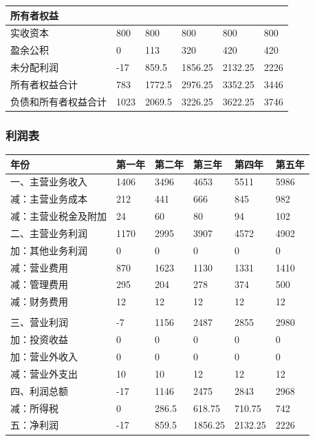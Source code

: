 \documentclass[UTF8]{ctexart}
\begin{document}
\begin{table}[H]
\begin{tabular}{|l|l|l|l|l|l|}
		所有者权益           &        &        &         &         &        \\ \hline
		实收资本             & 800    & 800    & 800     & 800     & 800    \\ \hline
		盈余公积             & 0      & 113    & 320     & 420     & 420    \\ \hline
		未分配利润           & -17    & 859.5  & 1856.25 & 2132.25 & 2226   \\ \hline
		所有者权益合计       & 783    & 1772.5 & 2976.25 & 3352.25 & 3446   \\ \hline

		负债和所有者权益合计 & 1023   & 2069.5 & 3226.25 & 3622.25 & 3746   \\ \hline
	\end{tabular}
\end{table}
\subsubsection{利润表}
\begin{table}[H]
	\centering
	\begin{tabular}{|l|l|l|l|l|l|}
		\hline
		年份                 & 第一年 & 第二年 & 第三年  & 第四年  & 第五年 \\ \hline
		一、主营业务收入     & 1406   & 3496   & 4653    & 5511    & 5986   \\ \hline
		减：主营业务成本     & 212    & 441    & 666     & 845     & 982    \\ \hline
		减：主营业税金及附加 & 24     & 60     & 80      & 94      & 102    \\ \hline
		二、主营业务利润     & 1170   & 2995   & 3907    & 4572    & 4902   \\ \hline
		加：其他业务利润     & 0      & 0      & 0       & 0       & 0      \\ \hline
		减：营业费用         & 870    & 1623   & 1130    & 1331    & 1410   \\ \hline
		减：管理费用         & 295    & 204    & 278     & 374     & 500    \\ \hline
		减：财务费用         & 12     & 12     & 12      & 12      & 12     \\ \hline
		                     &        &        &         &         &        \\ \hline
		三、营业利润         & -7     & 1156   & 2487    & 2855    & 2980   \\ \hline
		加：投资收益         & 0      & 0      & 0       & 0       & 0      \\ \hline
		加：营业外收入       & 0      & 0      & 0       & 0       & 0      \\ \hline
		减：营业外支出       & 10     & 10     & 12      & 12      & 12     \\ \hline
		四、利润总额         & -17    & 1146   & 2475    & 2843    & 2968   \\ \hline
		减：所得税           & 0      & 286.5  & 618.75  & 710.75  & 742    \\ \hline
		五：净利润           & -17    & 859.5  & 1856.25 & 2132.25 & 2226   \\ \hline
	\end{tabular}
\end{table}
\end{document}
